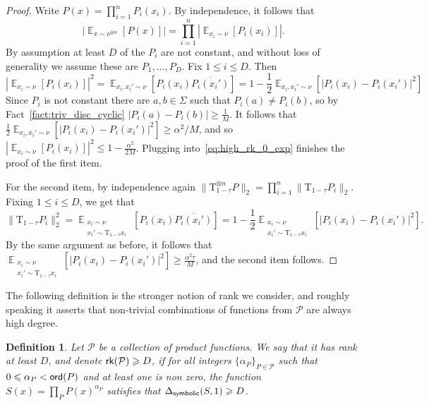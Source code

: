 \documentclass[11pt]{article}
\newtheorem{definition}[thm]{Definition}
\newcommand\card[1]{\left| {#1} \right|}
\newcommand\norm[1]{\| #1 \|}
\newcommand\Expect[2]{{\mathop{\mathbb{E}}_{#1}\left[ {#2} \right]}}
\renewcommand\geq{\geqslant}
\renewcommand\leq{\leqslant}
\begin{document}
\begin{proof}
    Write $P(x) = \prod\limits_{i=1}^{n}P_i(x_i)$. 
    By independence, it follows that
    \begin{equation}\label{eq:high_rk_0_exp}
    \card{\Expect{x\sim\nu^{\otimes n}}{P(x)}}
    =\prod\limits_{i=1}^{n} \card{\Expect{x_i\sim\nu}{P_i(x_i)}}.
    \end{equation}
    By assumption at least $D$ of the $P_i$ are not constant, and without loss of generality we assume these are $P_1,\ldots,P_D$. Fix $1\leq i\leq D$. Then
    \[
    \card{\Expect{x_i\sim\nu}{P_i(x_i)}}^2
    =\Expect{x_i,x_i'\sim\nu}{P_i(x_i)\overline{P_i(x_i')}}
    =
    1-\frac{1}{2}
    \Expect{x_i,x_i'\sim\nu}{\card{P_i(x_i)-P_i(x_i')}^2}
    \]
    Since $P_i$ is not constant there are $a,b\in\Sigma$ such that $P_i(a)\neq P_i(b)$, so by Fact~\ref{fact:triv_disc_cyclic} $\card{P_i(a)-P_i(b)}\geq \frac{1}{M}$. It follows that
    $\frac{1}{2}
    \Expect{x_i,x_i'\sim\nu}{\card{P_i(x_i)-P_i(x_i')}^2}\geq \alpha^2/M$, and so $\card{\Expect{x_i\sim\nu}{P_i(x_i)}}^2\leq 1-\frac{\alpha^2}{2M}$. Plugging into~\eqref{eq:high_rk_0_exp} finishes the proof of the first item.

    For the second item, by independence again $\norm{\mathrm{T}_{1-\tau}^{\otimes n}P}_2=\prod\limits_{i=1}^{n}\norm{\mathrm{T}_{1-\tau}P_i}_2$. Fixing $1\leq i\leq D$, we get that
    \[
    \norm{\mathrm{T}_{1-\tau}P_i}_2^2
    =\Expect{\substack{x_i\sim\nu\\x_i'\sim\mathrm{T}_{1-\tau}x_i}}{P_i(x_i)\overline{P_i(x_i')}}
    =
    1-\frac{1}{2}\Expect{\substack{x_i\sim\nu\\x_i'\sim\mathrm{T}_{1-\tau}x_i}}{\card{P_i(x_i)-P_i(x_i')}^2}.
    \]
    By the same argument as before, it follows that 
    $\Expect{\substack{x_i\sim\nu\\x_i'\sim\mathrm{T}_{1-\tau}x_i}}{\card{P_i(x_i)-P_i(x_i')}^2}\geq \frac{\alpha^2\tau}{M}$, and the second item follows.
\end{proof}

The following definition is the stronger notion of rank we consider, and roughly speaking it asserts that non-trivial combinations of functions from $\mathcal{P}$ are always high degree.
\begin{definition}\label{def:rank}
    Let $\mathcal{P}$ be a collection of product functions. We say that it has rank at least $D$, and denote ${\sf rk}(\mathcal{P})\geq D$, if for all integers $\{\alpha_P\}_{P\in\mathcal{P}}$ such that $0\leq \alpha_P<{\sf ord}(P)$ and at least one is non zero, the function $S(x) = \prod\limits_{P}P(x)^{\alpha_P}$ satisfies that
    $\Delta_{{\sf symbolic}}(S,1)\geq D$. 
\end{definition}
\end{document}
